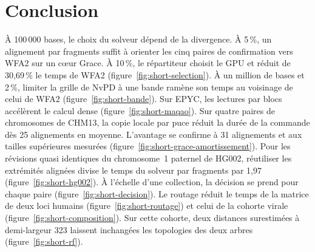\Needspace{.56\textheight}
\section{Conclusion}
À 100\,000 bases, le choix du solveur dépend de la divergence. À 5\,\%, un alignement par fragments suffit à orienter les cinq paires de confirmation vers WFA2 sur un cœur Grace. À 10\,\%, le répartiteur choisit le GPU et réduit de 30,69\,\% le temps de WFA2 (figure~\ref{fig:short-selection}). À un million de bases et 2\,\%, limiter la grille de NvPD à une bande ramène son temps au voisinage de celui de WFA2 (figure~\ref{fig:short-bande}). Sur EPYC, les lectures par blocs accélèrent le calcul dense (figure~\ref{fig:short-maqao}). Sur quatre paires de chromosomes de CHM13, la copie locale par puce réduit la durée de la commande dès 25 alignements en moyenne. L’avantage se confirme à 31 alignements et aux tailles supérieures mesurées (figure~\ref{fig:short-grace-amortissement}). Pour les révisions quasi identiques du chromosome~1 paternel de HG002, réutiliser les extrémités alignées divise le temps du solveur par fragments par 1,97 (figure~\ref{fig:short-hg002}). À l’échelle d’une collection, la décision se prend pour chaque paire (figure~\ref{fig:short-decision}). Le routage réduit le temps de la matrice de deux loci humains (figure~\ref{fig:short-routage}) et celui de la cohorte virale (figure~\ref{fig:short-composition}). Sur cette cohorte, deux distances surestimées à demi-largeur 323 laissent inchangées les topologies des deux arbres (figure~\ref{fig:short-rf}).
